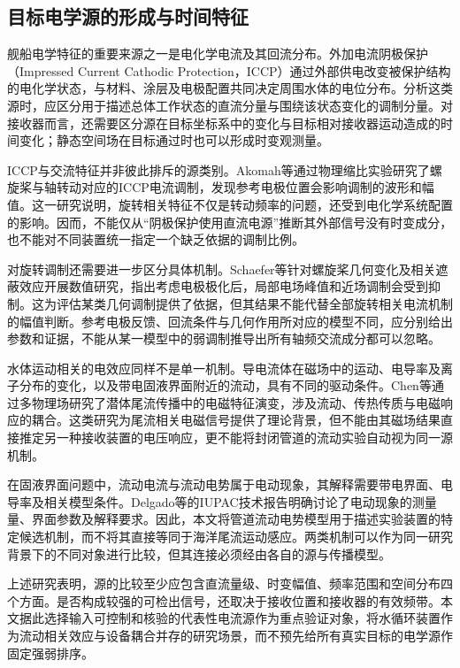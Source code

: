 \subsection{目标电学源的形成与时间特征}

舰船电学特征的重要来源之一是电化学电流及其回流分布。外加电流阴极保护（Impressed Current Cathodic Protection，ICCP）通过外部供电改变被保护结构的电化学状态，与材料、涂层及电极配置共同决定周围水体的电位分布。分析这类源时，应区分用于描述总体工作状态的直流分量与围绕该状态变化的调制分量。对接收器而言，还需要区分源在目标坐标系中的变化与目标相对接收器运动造成的时间变化；静态空间场在目标通过时也可以形成时变观测量。

ICCP与交流特征并非彼此排斥的源类别。Akomah等通过物理缩比实验研究了螺旋桨与轴转动对应的ICCP电流调制，发现参考电极位置会影响调制的波形和幅值\cite{akomah2002}。这一研究说明，旋转相关特征不仅是转动频率的问题，还受到电化学系统配置的影响。因而，不能仅从“阴极保护使用直流电源”推断其外部信号没有时变成分，也不能对不同装置统一指定一个缺乏依据的调制比例。

对旋转调制还需要进一步区分具体机制。Schaefer等针对螺旋桨几何变化及相关遮蔽效应开展数值研究，指出考虑电极极化后，局部电场峰值和近场调制会受到抑制\cite{schaefer2011}。这为评估某类几何调制提供了依据，但其结果不能代替全部旋转相关电流机制的幅值判断。参考电极反馈、回流条件与几何作用所对应的模型不同，应分别给出参数和证据，不能从某一模型中的弱调制推导出所有轴频交流成分都可以忽略。

水体运动相关的电效应同样不是单一机制。导电流体在磁场中的运动、电导率及离子分布的变化，以及带电固液界面附近的流动，具有不同的驱动条件。Chen等通过多物理场研究了潜体尾流传播中的电磁特征演变，涉及流动、传热传质与电磁响应的耦合\cite{chen2022}。这类研究为尾流相关电磁信号提供了理论背景，但不能由其磁场结果直接推定另一种接收装置的电压响应，更不能将封闭管道的流动实验自动视为同一源机制。

在固液界面问题中，流动电流与流动电势属于电动现象，其解释需要带电界面、电导率及相关模型条件。Delgado等的IUPAC技术报告明确讨论了电动现象的测量量、界面参数及解释要求\cite{delgado2005}。因此，本文将管道流动电势模型用于描述实验装置的特定候选机制，而不将其直接等同于海洋尾流运动感应。两类机制可以作为同一研究背景下的不同对象进行比较，但其连接必须经由各自的源与传播模型。

上述研究表明，源的比较至少应包含直流量级、时变幅值、频率范围和空间分布四个方面。是否构成较强的可检出信号，还取决于接收位置和接收器的有效频带。本文据此选择输入可控制和核验的代表性电流源作为重点验证对象，将水循环装置作为流动相关效应与设备耦合并存的研究场景，而不预先给所有真实目标的电学源作固定强弱排序。

